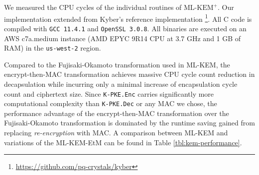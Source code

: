 \documentclass[runningheads]{llncs}
\newcommand{\encrypt}{\texttt{Enc}}
\newcommand{\decrypt}{\texttt{Dec}}
\def\mlkemplus{\text{ML-KEM}^+}
\begin{document}
We measured the CPU cycles of the individual routines of $\mlkemplus$. Our implementation extended from Kyber's reference implementation \footnote{\url{https://github.com/pq-crystals/kyber}}. All C code is compiled with \texttt{GCC 11.4.1} and \texttt{OpenSSL 3.0.8}. All binaries are executed on an AWS c7a.medium instance (AMD EPYC 9R14 CPU at 3.7 GHz and 1 GB of RAM) in the \texttt{us-west-2} region.

Compared to the Fujisaki-Okamoto transformation used in ML-KEM, the encrypt-then-MAC transformation achieves massive CPU cycle count reduction in decapsulation while incurring only a minimal increase of encapsulation cycle count and ciphertext size. Since \texttt{K-PKE.\encrypt} carries significantly more computational complexity than \texttt{K-PKE.\decrypt} or any MAC we chose, the performance advantage of the encrypt-then-MAC transformation over the Fujisaki-Okamoto transformation is dominated by the runtime saving gained from replacing \emph{re-encryption} with MAC. A comparison between ML-KEM and variations of the ML-KEM-EtM can be found in Table \ref{tbl:kem-performance}.
\end{document}
